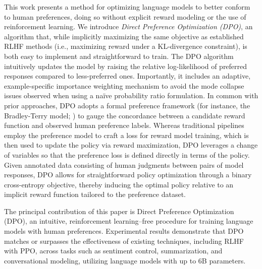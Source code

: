 This work presents a method for optimizing language models to better conform to human preferences, doing so without explicit reward modeling or the use of reinforcement learning. We introduce \textit{{Direct Preference Optimization} (DPO)}, an algorithm that, while implicitly maximizing the same objective as established RLHF methods (i.e., maximizing reward under a KL-divergence constraint), is both easy to implement and straightforward to train. The DPO algorithm intuitively updates the model by raising the relative log-likelihood of preferred responses compared to less-preferred ones. Importantly, it includes an adaptive, example-specific importance weighting mechanism to avoid the mode collapse issues observed when using a naïve probability ratio formulation. In common with prior approaches, DPO adopts a formal preference framework (for instance, the Bradley-Terry model; \cite{bradley1952rankanalysis}) to gauge the concordance between a candidate reward function and observed human preference labels. Whereas traditional pipelines employ the preference model to craft a loss for reward model training, which is then used to update the policy via reward maximization, DPO leverages a change of variables so that the preference loss is defined directly in terms of the policy. Given annotated data consisting of human judgments between pairs of model responses, DPO allows for straightforward policy optimization through a binary cross-entropy objective, thereby inducing the optimal policy relative to an implicit reward function tailored to the preference dataset.

The principal contribution of this paper is Direct Preference Optimization (DPO), an intuitive, reinforcement learning–free procedure for training language models with human preferences. Experimental results demonstrate that DPO matches or surpasses the effectiveness of existing techniques, including RLHF with PPO, across tasks such as sentiment control, summarization, and conversational modeling, utilizing language models with up to 6B parameters.

